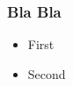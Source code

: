 \documentclass[pdftex,10pt,,xcolor=dvipsnames]{beamer}
\begin{document}
\begin{frame}
\frametitle{Bla Bla}
\begin{itemize}
\item First 
\item Second
\end{itemize}
\end{frame}
\end{document}
